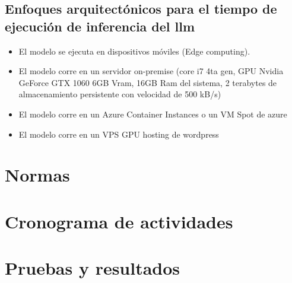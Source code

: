 \documentclass{article}
\begin{document}
\subsection{Enfoques arquitectónicos para el tiempo de ejecución de inferencia del llm}

\begin{itemize}[H]
    \item El modelo se ejecuta en dispositivos móviles (Edge computing).
    \item El modelo corre en un servidor on-premise (core i7 4ta gen, GPU Nvidia GeForce GTX 1060 6GB Vram, 16GB Ram del sistema, 2 terabytes de almacenamiento persistente con velocidad de 500 kB/s)
    \item El modelo corre en un Azure Container Instances o un VM Spot de azure
    \item El modelo corre en un VPS GPU hosting de wordpress
\end{itemize}


\section{Normas}

\section{Cronograma de actividades}



\section{Pruebas y resultados}

\end{document}
